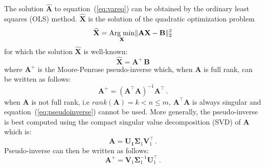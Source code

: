 The solution $\widehat{\mathbf{A}}$ to
equation~(\ref{eq:vareq}) can be obtained by the ordinary least squares (OLS)
method. $\widehat{\mathbf{X}}$ is the solution of the quadratic optimization problem
\begin{equation*}
\widehat{\mathbf{X}} = \underset{\mathbf{X}}{\text{Arg\;min}}
\|\mathbf{A}\mathbf{X}-\mathbf{B}\|_2^2
\end{equation*}
\noindent for which the solution $\widehat{\mathbf{X}}$ is well-known:
\begin{equation*}
\label{eq:MP}
\widehat{\mathbf{X}}=\mathbf{A}^{\!\!+}\,\mathbf{B}
\end{equation*}
\noindent where $\mathbf{A}^{\!\!+}$ is the Moore-Penrose pseudo-inverse
which, when $\mathbf{A}$ is full rank, can be written as follows: 
\begin{equation}
\label{eq:pseudoinverse}
\mathbf{A}^{\!\!+}= (\mathbf{A}^{\!\!\top} \mathbf{A})^{-1}\mathbf{A}^{\!\!\top} \, .
\end{equation}
when $\mathbf{A}$ is not full rank, i.e
$rank(\mathbf{A})=k <  n \leq m$, $\mathbf{A}^\top \mathbf{A}$ is
always singular and equation~(\ref{eq:pseudoinverse}) cannot be used.
More generally, the pseudo-inverse is best computed using the compact
singular value decomposition (SVD) of $\mathbf{A}$ which is:
\begin{equation*}
    \label{eq:compactsvd}
    \mathbf{A}=
    \mathbf{U_1}
    \boldsymbol \Sigma_1
    \mathbf{V}_1^{\top} \, .
\end{equation*}
Pseudo-inverse can then be written as follows:
\begin{equation*}
\label{eq:pseudoinversesvd}
\mathbf{A}^{\!\!+} = \mathbf{V}_1 \boldsymbol \Sigma_1^{-1} \mathbf{U}_1^\top \, .
\end{equation*}



